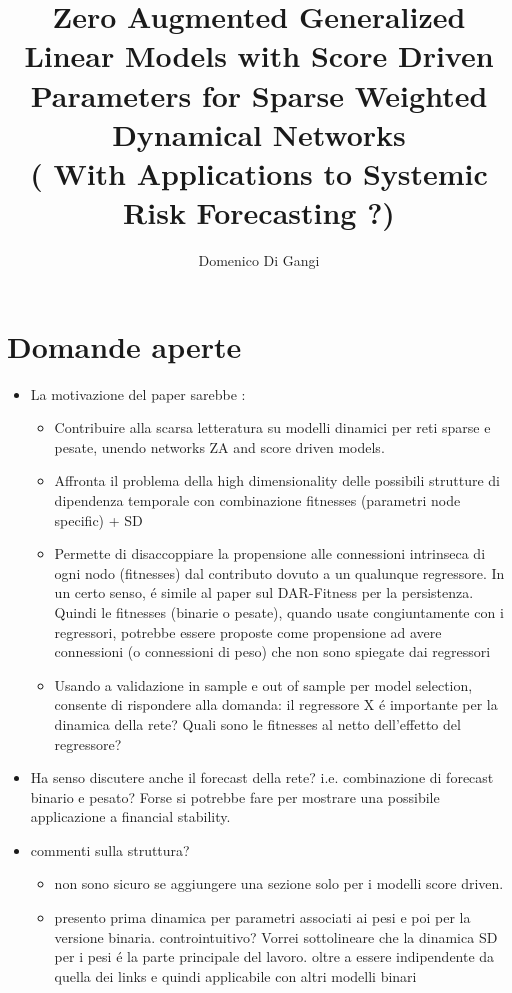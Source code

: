 \documentclass[a4paper,12pt]{article}
\title{Zero Augmented Generalized Linear Models with Score Driven Parameters for Sparse Weighted Dynamical Networks \\( With Applications to Systemic Risk Forecasting ?)}
\author{Domenico Di Gangi}
\begin{document}
\maketitle
\section*{Domande aperte}
\begin{itemize}
	\item La motivazione del paper sarebbe : 
		\begin{itemize}
			\item Contribuire alla scarsa letteratura su modelli dinamici per reti sparse e pesate, unendo networks ZA and score driven models.
			\item Affronta il problema della high dimensionality delle possibili strutture di dipendenza temporale con combinazione fitnesses (parametri node specific) + SD 
			\item Permette di disaccoppiare la propensione alle connessioni intrinseca di ogni nodo (fitnesses) dal contributo dovuto a un qualunque regressore. In un certo senso, \'e simile al paper sul DAR-Fitness per la persistenza. Quindi le fitnesses (binarie o pesate), quando usate congiuntamente con i regressori, potrebbe essere proposte come propensione ad avere connessioni (o connessioni di peso) che non sono spiegate dai regressori
			\item Usando a validazione in sample e out of sample per model selection, consente di rispondere alla domanda: il regressore X \'e importante per la dinamica della rete? Quali sono le fitnesses al netto dell'effetto del regressore?
		\end{itemize}

	
	
	\item Ha senso discutere anche il forecast della rete? i.e. combinazione di forecast binario e pesato? Forse si potrebbe fare per mostrare una possibile applicazione a financial stability.
	
	
	
	\item commenti sulla struttura? 
	\begin{itemize}
		\item non sono sicuro se aggiungere una sezione solo per i modelli score driven. 
		\item presento prima dinamica per parametri associati ai pesi e poi per la versione binaria. controintuitivo? Vorrei sottolineare che la dinamica SD per i pesi \'e la parte principale del lavoro. oltre a essere indipendente da quella dei links e quindi applicabile con altri modelli binari		
	\end{itemize}
\end{itemize}
\newpage
\end{document}
